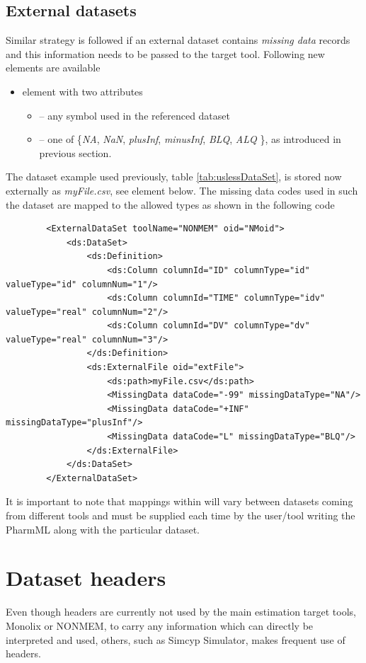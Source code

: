 \subsection{External datasets}
Similar strategy is followed if an external dataset contains \emph{missing data}
records and this information needs to be passed to the target tool. Following 
new elements are available 
\begin{itemize}
\item 
{} element with two attributes 
\begin{itemize}
\item 
{} -- any symbol used in the referenced dataset
\item 
{} -- one of \{\emph{NA}, \emph{NaN}, \emph{plusInf}, \emph{minusInf}, 
\emph{BLQ}, \emph{ALQ} \}, as introduced in previous section.
\end{itemize}
\end{itemize}                
The dataset example used previously, table \ref{tab:uslessDataSet}, is stored now
externally as \emph{myFile.csv}, see  element below.
The missing data codes used in such the dataset are mapped to the allowed types
as shown in the following code
\lstset{language=XML}
\begin{lstlisting}
        <ExternalDataSet toolName="NONMEM" oid="NMoid">
            <ds:DataSet>
                <ds:Definition>
                    <ds:Column columnId="ID" columnType="id" valueType="id" columnNum="1"/>
                    <ds:Column columnId="TIME" columnType="idv" valueType="real" columnNum="2"/>
                    <ds:Column columnId="DV" columnType="dv" valueType="real" columnNum="3"/>
                </ds:Definition>
                <ds:ExternalFile oid="extFile">
                    <ds:path>myFile.csv</ds:path>
                    <MissingData dataCode="-99" missingDataType="NA"/>
                    <MissingData dataCode="+INF" missingDataType="plusInf"/>
                    <MissingData dataCode="L" missingDataType="BLQ"/>
                </ds:ExternalFile>
            </ds:DataSet>
        </ExternalDataSet>
\end{lstlisting}
It is important to note that mappings within  will vary between datasets
coming from different tools and must be supplied each time by the user/tool writing the 
PharmML along with the particular dataset.

\section{Dataset headers}
\label{sec:headers}
Even though headers are currently not used by the main estimation target 
tools, Monolix or NONMEM, to carry any information which can directly be interpreted 
and used, others, such as Simcyp Simulator, makes frequent use of headers. 

